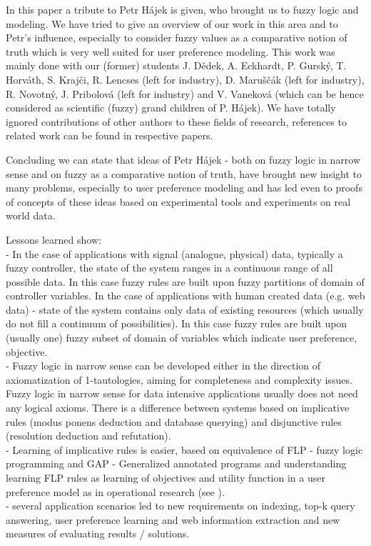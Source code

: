 In this paper a tribute to Petr H\'{a}jek is given, who brought us to fuzzy logic and modeling. We have tried to give an overview of our work in this area and to Petr's influence, especially to consider fuzzy values as a comparative notion of truth which is very well suited for user preference modeling. This work was mainly done with our (former) students J. D\v{e}dek, A. Eckhardt, P. Gursk\'{y}, T. Horv\'{a}th, S. Kraj\v{c}i, R. Lencses (left for industry), D. Maru\v{s}\v{c}{\'a}k (left for industry), R. Novotn\'{y}, J. Pribolov{\'{a}} (left for industry) and V. Vanekov{\'{a}} (which can be hence considered as scientific (fuzzy) grand children of P. H\'{a}jek). We have totally ignored contributions of other authors to these fields of research, references to related work can be found in respective papers. 

     Concluding we can state that ideas of Petr H\'{a}jek - both on fuzzy logic in narrow sense and on fuzzy as a comparative notion of truth, have brought new insight to many problems, especially to user preference modeling and has led  even to proofs of concepts of these ideas based on experimental tools and experiments on real world data.
     
          Lessons learned show:
\\\noindent - In the case of applications with signal (analogue, physical) data, typically a fuzzy controller, the state of the system ranges in a continuous range of all possible data. In this case fuzzy rules are built upon fuzzy partitions of domain of controller variables. In the case of applications with human created data (e.g. web data) - state of the system contains only data of existing resources (which usually do not fill a continuum of possibilities). In this case fuzzy rules are built upon (usually one) fuzzy subset of domain of variables which indicate user preference, objective.
\\\noindent - Fuzzy logic in narrow sense can be developed either in the direction of axiomatization of 1-tautologies, aiming for completeness and complexity issues. Fuzzy logic in narrow sense for data intensive applications usually does not need any logical axioms. There is a difference between systems based on implicative rules (modus ponens deduction and database querying) and disjunctive rules (resolution deduction and refutation). 
\\\noindent - Learning of implicative rules is easier, based on equivalence of FLP - fuzzy logic programming and GAP - Generalized annotated programs  and understanding learning FLP rules as learning of objectives and utility function in a user preference model as in operational research (see \cite{47}). 
\\\noindent - several application scenarios led to new requirements on indexing, top-k query answering, user preference learning and web information extraction and new measures of evaluating results / solutions. 

